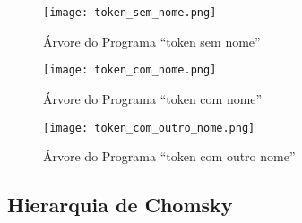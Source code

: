 \begin{figure}[H]
\caption{Árvore do Programa ``token sem nome''}
\label{Figure:ArvoresDosTokens1}
\centering
\texttt{[image: token\_sem\_nome.png]}
\end{figure}
\begin{figure}[H]
\caption{Árvore do Programa ``token com nome''}
\label{Figure:ArvoresDosTokens2}
\centering
\texttt{[image: token\_com\_nome.png]}
\end{figure}
\begin{figure}[H]
\caption{Árvore do Programa ``token com outro nome''}
\label{Figure:ArvoresDosTokens3}
\centering
\texttt{[image: token\_com\_outro\_nome.png]}
\end{figure}


\subsection{Hierarquia de Chomsky}
\label{sectionHierarquiaDeChomsky}

